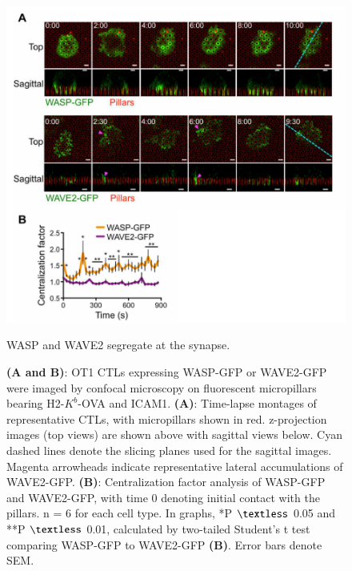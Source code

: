 \begin{figure}[htbp]
	\centering
	\includegraphics[width=\textwidth]{../figures/chapter2/fig5flprobes.png}
	\caption{WASP and WAVE2 segregate at the synapse.}
	\caption*{\textbf{(A and B)}: OT1 CTLs expressing WASP-GFP or WAVE2-GFP were imaged by confocal microscopy on fluorescent micropillars bearing H2-$K^{b}$-OVA and ICAM1. \textbf{(A)}: Time-lapse montages of representative CTLs, with micropillars shown in red. z-projection images (top views) are shown above with sagittal views below. Cyan dashed lines denote the slicing planes used for the sagittal images. Magenta arrowheads indicate representative lateral accumulations of WAVE2-GFP. \textbf{(B)}: Centralization factor analysis of WASP-GFP and WAVE2-GFP, with time 0 denoting initial contact with the pillars. n = 6 for each cell type. In graphs, *P $\textless$ 0.05 and **P $\textless$ 0.01, calculated by two-tailed Student’s t test comparing WASP-GFP to WAVE2-GFP \textbf{(B)}. Error bars denote SEM.}
	\label{fig:fig5flprobes}
\end{figure}

